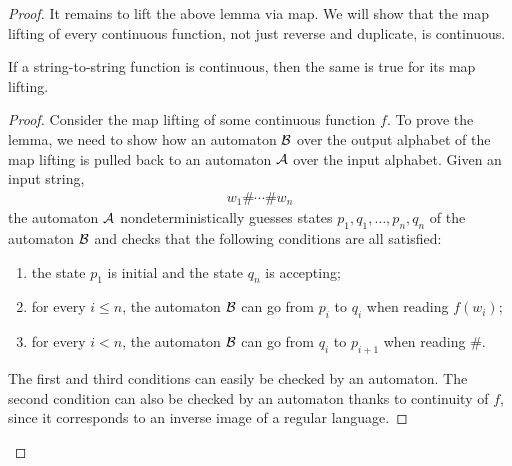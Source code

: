 \begin{proof}
It remains to lift the above lemma via map. We will show that the map lifting of every continuous function, not just reverse and duplicate, is continuous.
    \begin{lemma}
    \label{lem:map-lifting-continuous}
    If a string-to-string function is continuous, then the same is true for  its map lifting.
    \end{lemma}
    \begin{proof}
Consider the map lifting of some continuous  function $f$. To prove the lemma, we need to show how an automaton ${\mathcal B}$ over the output alphabet of the map lifting  is pulled back to an automaton ${\mathcal A}$ over the input alphabet.    Given an input string, 
\begin{align*}
w_1 \# \cdots \# w_n
\end{align*}
the automaton ${\mathcal A}$ 
nondeterministically guesses states $p_1,q_1,\ldots,p_n,q_n$ of  the automaton  ${\mathcal B}$ and checks that the following conditions are all satisfied:
\begin{enumerate}
    \item the state $p_1$ is initial and the state $q_n$ is accepting;
    \item for every $i\leq n$, the automaton ${\mathcal B}$ can go from $p_i$ to $q_i$ when reading $f(w_i)$;
    \item for every $i < n$, the automaton ${\mathcal B}$ can go from $q_i$ to $p_{i+1}$ when reading $\#$.
\end{enumerate}
The first and third conditions can easily be checked by an automaton. 
The second condition can also  be checked by an automaton thanks to continuity of $f$, since it corresponds to an inverse image of a regular language. 
    \end{proof}
\end{proof}

